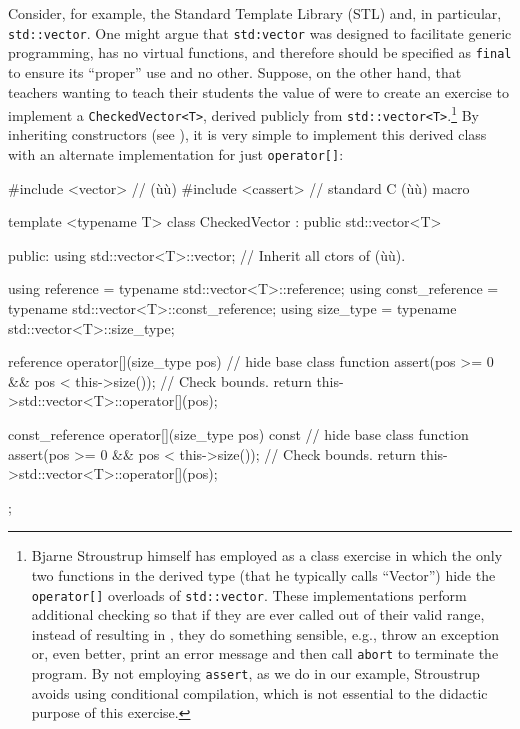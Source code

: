 {Consider, for example, the Standard Template Library (STL) and, in
particular, \lstinline!std::vector!. One might argue that
\lstinline!std:vector! was designed to facilitate generic programming, has
no virtual functions, and therefore should be specified as
\lstinline!final! to ensure its ``proper'' use and no other. Suppose, on
the other hand, that teachers wanting to teach their students the value
of  were to create an exercise to
implement a \lstinline!CheckedVector<T>!, derived publicly from
\lstinline!std::vector<T>!.{\cprotect\footnote{Bjarne Stroustrup himself
has employed as a class exercise in which the only two functions in
the derived type (that he typically calls ``Vector'') hide the
\lstinline!operator[]! overloads of \lstinline!std::vector!. These
implementations perform additional checking so that if they are ever
called out of their valid range, instead of resulting in
, they do something sensible, e.g., throw
an exception or, even better, print an error message and then call
\lstinline!abort! to terminate the program. By not employing
\lstinline!assert!, as we do in our example, Stroustrup avoids using
conditional compilation, which is not essential to the didactic
  purpose of this exercise.}} By inheriting constructors (see
), it is very simple to implement
this derived class with an alternate implementation for just
\lstinline!operator[]!:

\begin{emcppslisting}
#include <vector>   // (ù{}ù)
#include <cassert>  // standard C (ù{}ù) macro

template <typename T>
class CheckedVector : public std::vector<T>
{
public:
    using std::vector<T>::vector;  // Inherit all ctors of (ù{}ù).

    using reference       = typename std::vector<T>::reference;
    using const_reference = typename std::vector<T>::const_reference;
    using size_type       = typename std::vector<T>::size_type;

    reference operator[](size_type pos)              // hide base class function
    {
        assert(pos >= 0 && pos < this->size());      // Check bounds.
        return this->std::vector<T>::operator[](pos);
    }

    const_reference operator[](size_type pos) const  // hide base class function
    {
        assert(pos >= 0 && pos < this->size());      // Check bounds.
        return this->std::vector<T>::operator[](pos);
    }
};
\end{emcppslisting}
    

}
